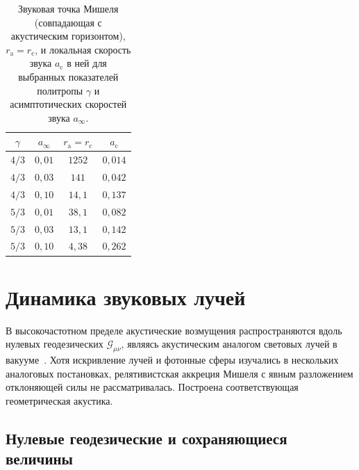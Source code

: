\documentclass[12pt,a4paper,preprint]{elsarticle}
\begin{document}
            \begin{table}[htb]
                \centering
                \caption{Звуковая точка Мишеля (совпадающая с акустическим горизонтом), $r_{\mathrm{a}}=r_{\mathrm{c}}$, и локальная скорость звука $a_{\mathrm{c}}$ в ней для выбранных показателей политропы $\gamma$ и асимптотических скоростей звука $a_{\infty}$.}
                \label{tab:sonic-point}
                {\small
                \begin{tabular}{cccc}
                    \toprule
                    $\gamma$ & $a_{\infty}$ & $r_{\mathrm{a}}=r_{\mathrm{c}}$ & $a_{\mathrm{c}}$ \\
                    \midrule
                    $4/3$ & $0{,}01$ & $1252$ & $0{,}014$ \\
                    $4/3$ & $0{,}03$ & $141$  & $0{,}042$ \\
                    $4/3$ & $0{,}10$ & $14{,}1$ & $0{,}137$ \\
                    $5/3$ & $0{,}01$ & $38{,}1$ & $0{,}082$ \\
                    $5/3$ & $0{,}03$ & $13{,}1$ & $0{,}142$ \\
                    $5/3$ & $0{,}10$ & $4{,}38$ & $0{,}262$ \\
                    \bottomrule
                \end{tabular}
                }
            \end{table}

    \section{Динамика звуковых лучей}\label{sec:rays}

        В высокочастотном пределе акустические возмущения распространяются вдоль нулевых геодезических $\mathcal{G}_{\mu\nu}$, являясь акустическим аналогом световых лучей в вакууме~\cite{VisserM_AcousticBlackHolesHorizonsErgospheresAndHawkingRadiation_1998, BarceloC_LiberatiS_VisserM_AnalogueGravity_2011}. Хотя искривление лучей и фотонные сферы изучались в нескольких аналоговых постановках, релятивистская аккреция Мишеля с явным разложением отклоняющей силы не рассматривалась. Построена соответствующая геометрическая акустика.

        \subsection{Нулевые геодезические и сохраняющиеся величины}\label{subsec:null-geodesics}
\end{document}
